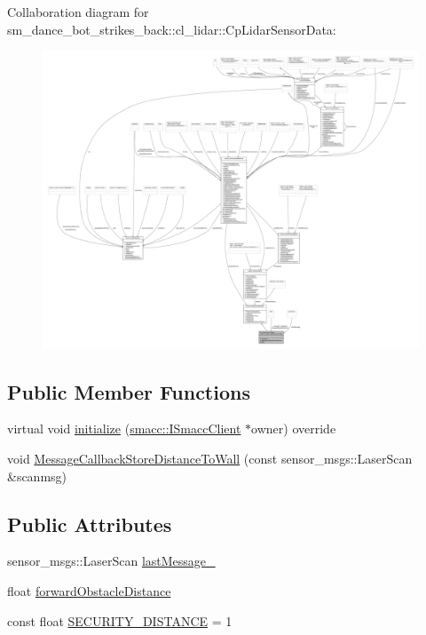 Collaboration diagram for sm\+\_\+dance\+\_\+bot\+\_\+strikes\+\_\+back\+:\+:cl\+\_\+lidar\+:\+:Cp\+Lidar\+Sensor\+Data\+:
\nopagebreak
\begin{figure}[H]
\begin{center}
\leavevmode
\includegraphics[width=350pt]{classsm__dance__bot__strikes__back_1_1cl__lidar_1_1CpLidarSensorData__coll__graph}
\end{center}
\end{figure}
\subsection*{Public Member Functions}
\begin{DoxyCompactItemize}
\item 
virtual void \hyperlink{classsm__dance__bot__strikes__back_1_1cl__lidar_1_1CpLidarSensorData_a8ea64aab6a48e8359a195a8766703c26}{initialize} (\hyperlink{classsmacc_1_1ISmaccClient}{smacc\+::\+I\+Smacc\+Client} $\ast$owner) override
\item 
void \hyperlink{classsm__dance__bot__strikes__back_1_1cl__lidar_1_1CpLidarSensorData_aefe481c1441305a6adf5266c49d941a4}{Message\+Callback\+Store\+Distance\+To\+Wall} (const sensor\+\_\+msgs\+::\+Laser\+Scan \&scanmsg)
\end{DoxyCompactItemize}
\subsection*{Public Attributes}
\begin{DoxyCompactItemize}
\item 
sensor\+\_\+msgs\+::\+Laser\+Scan \hyperlink{classsm__dance__bot__strikes__back_1_1cl__lidar_1_1CpLidarSensorData_a8a84fbb0a3f35a7fc040b266d33075ec}{last\+Message\+\_\+}
\item 
float \hyperlink{classsm__dance__bot__strikes__back_1_1cl__lidar_1_1CpLidarSensorData_a40d6ddeab582ec69477622e3c060b210}{forward\+Obstacle\+Distance}
\item 
const float \hyperlink{classsm__dance__bot__strikes__back_1_1cl__lidar_1_1CpLidarSensorData_aa83f62091b2455323340a87e8636df60}{S\+E\+C\+U\+R\+I\+T\+Y\+\_\+\+D\+I\+S\+T\+A\+N\+CE} = 1
\end{DoxyCompactItemize}

